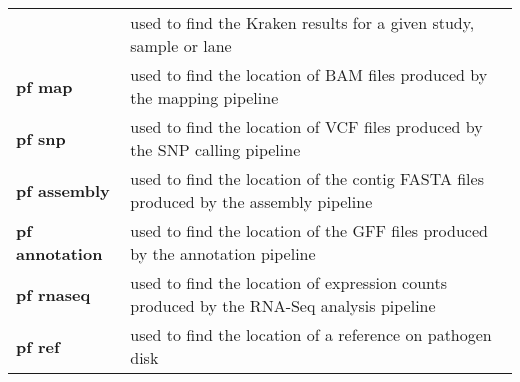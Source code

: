\documentclass[11pt]{article}
\begin{document}
\begin{longtable}[]{@{}ll@{}}
\begin{minipage}[t]{0.47\columnwidth}
\end{minipage} & \begin{minipage}[t]{0.47\columnwidth}\raggedright
used to find the Kraken results for a given study, sample or lane\strut
\end{minipage}\tabularnewline
\begin{minipage}[t]{0.47\columnwidth}\raggedright
\textbf{pf map}\strut
\end{minipage} & \begin{minipage}[t]{0.47\columnwidth}\raggedright
used to find the location of BAM files produced by the mapping
pipeline\strut
\end{minipage}\tabularnewline
\begin{minipage}[t]{0.47\columnwidth}\raggedright
\textbf{pf snp}\strut
\end{minipage} & \begin{minipage}[t]{0.47\columnwidth}\raggedright
used to find the location of VCF files produced by the SNP calling
pipeline\strut
\end{minipage}\tabularnewline
\begin{minipage}[t]{0.47\columnwidth}\raggedright
\textbf{pf assembly}\strut
\end{minipage} & \begin{minipage}[t]{0.47\columnwidth}\raggedright
used to find the location of the contig FASTA files produced by the
assembly pipeline\strut
\end{minipage}\tabularnewline
\begin{minipage}[t]{0.47\columnwidth}\raggedright
\textbf{pf annotation}\strut
\end{minipage} & \begin{minipage}[t]{0.47\columnwidth}\raggedright
used to find the location of the GFF files produced by the annotation
pipeline\strut
\end{minipage}\tabularnewline
\begin{minipage}[t]{0.47\columnwidth}\raggedright
\textbf{pf rnaseq}\strut
\end{minipage} & \begin{minipage}[t]{0.47\columnwidth}\raggedright
used to find the location of expression counts produced by the RNA-Seq
analysis pipeline\strut
\end{minipage}\tabularnewline
\begin{minipage}[t]{0.47\columnwidth}\raggedright
\textbf{pf ref}\strut
\end{minipage} & \begin{minipage}[t]{0.47\columnwidth}\raggedright
used to find the location of a reference on pathogen disk\strut
\end{minipage}\tabularnewline
\hline
\end{longtable}
\end{document}
